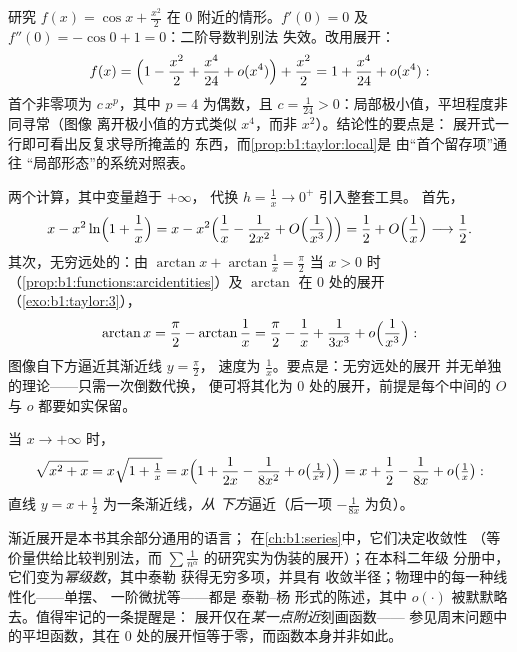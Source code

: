 \begin{example}[平坦临界点的分类]\label{ex:b1:taylor:flatmin}
研究 $f(x) = \cos x + \frac{x^2}{2}$ 在 $0$ 附近的情形。$f'(0) =
0$ 及 $f''(0) = -\cos 0 + 1 = 0$：二阶导数判别法
失效。改用展开：
\[
f(x) = \Bigl(1 - \frac{x^2}{2} + \frac{x^4}{24} +
o(x^4)\Bigr) + \frac{x^2}{2}
= 1 + \frac{x^4}{24} + o(x^4) :
\]
首个非零项为 $c\,x^p$，其中 $p = 4$ 为偶数，且 $c =
\frac{1}{24} > 0$：局部极小值，平坦程度非同寻常（图像
离开极小值的方式类似 $x^4$，而非 $x^2$）。结论性的要点是：
展开式一行即可看出反复求导所掩盖的
东西，而\cref{prop:b1:taylor:local}是
由“首个留存项”通往
“局部形态”的系统对照表。
\end{example}

\begin{example}[无穷远处的展开]\label{ex:b1:taylor:atinfinity}
两个计算，其中变量趋于 $+\infty$，
代换 $h = \frac1x \to 0^+$ 引入整套工具。
首先，
\[
x - x^2\ln\Bigl(1 + \frac1x\Bigr)
= x - x^2\Bigl(\frac1x - \frac{1}{2x^2} +
O\Bigl(\frac{1}{x^3}\Bigr)\Bigr)
= \frac12 + O\Bigl(\frac1x\Bigr) \longrightarrow \frac12 .
\]
其次，无穷远处的：由 $\arctan x +
\arctan\frac1x = \frac\pi2$ 当 $x > 0$ 时
（\cref{prop:b1:functions:arcidentities}）及
$\arctan$ 在 $0$ 处的展开（\cref{exo:b1:taylor:3}），
\[
\arctan x = \frac\pi2 - \arctan\frac1x
= \frac\pi2 - \frac1x + \frac{1}{3x^3} +
o\Bigl(\frac{1}{x^3}\Bigr) :
\]
图像自下方逼近其渐近线 $y = \frac\pi2$，
速度为 $\frac1x$。要点是：无穷远处的展开
并无单独的理论——只需一次倒数代换，
便可将其化为 $0$ 处的展开，前提是每个中间的
$O$ 与 $o$ 都要如实保留。
\end{example}

\begin{example}[用展开求渐近线]\label{ex:b1:taylor:asymptote}
当 $x \to +\infty$ 时，
\[
\sqrt{x^2 + x} = x\sqrt{1 + \tfrac1x}
= x\Bigl(1 + \frac{1}{2x} - \frac{1}{8x^2} + o\bigl(\tfrac{1}{x^2}\bigr)\Bigr)
= x + \frac12 - \frac{1}{8x} + o\bigl(\tfrac 1x\bigr):
\]
直线 $y = x + \frac12$ 为一条渐近线，\emph{从
下方}逼近（后一项 $-\frac{1}{8x}$ 为负）。
\end{example}

\begin{remark}[展开的后续应用]
渐近展开是本书其余部分通用的语言；
在\cref{ch:b1:series}中，它们决定收敛性
（等价量供给比较判别法，而 $\sum
\frac{1}{n^\alpha}$ 的研究实为伪装的展开）；在本科二年级
分册中，它们变为\emph{幂级数}，其中泰勒
获得无穷多项，并具有
收敛半径；物理中的每一种线性化——单摆、
一阶微扰等——都是 泰勒–杨 形式的陈述，其中
$o(\cdot)$ 被默默略去。值得牢记的一条提醒是：
展开仅在\emph{某一点附近}刻画函数——
参见周末问题中的平坦函数，其在
$0$ 处的展开恒等于零，而函数本身并非如此。
\end{remark}

